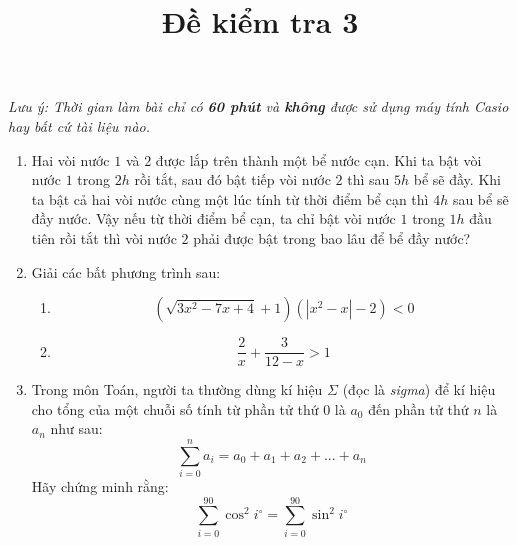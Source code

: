 \documentclass{article}
\title{Đề kiểm tra 3}
\begin{document}
\maketitle
\textit{Lưu ý: Thời gian làm bài chỉ có \textbf{60 phút} và \textbf{không} được sử dụng máy tính Casio hay bất cứ tài liệu nào.}
\begin{enumerate}[start=1,label={\bfseries Câu  \arabic*:},leftmargin=1in]
    \item Hai vòi nước $1$ và $2$ được lắp trên thành một bể nước cạn. Khi ta bật vòi nước $1$ trong $2h$ rồi tắt, sau đó bật tiếp vòi nước $2$ thì sau $5h$ bể sẽ đầy. Khi ta bật
cả hai vòi nước cùng một lúc tính từ thời điểm bể cạn thì $4h$ sau bể sẽ đầy nước. Vậy nếu từ thời điểm bể cạn, ta chỉ bật vòi nước $1$ trong $1h$ đầu tiên rồi tắt thì vòi nước $2$ phải được bật trong bao lâu để bể đầy nước?
    \item Giải các bất phương trình sau:
    \begin{enumerate}
        \item $$(\sqrt{3x^2-7x+4}+1)(|x^2-x|-2)<0$$
        \item $$\frac{2}{x}+\frac{3}{12-x}>1$$
    \end{enumerate}
    \item Trong môn Toán, người ta thường dùng kí hiệu $\Sigma$ (đọc là \textit{sigma}) để kí hiệu cho tổng của một chuỗi số tính từ phần tử thứ $0$ là $a_{0}$ đến phần tử
    thứ $n$ là $a_{n}$ như sau:
    $$\sum_{i=0}^{n}a_{i}=a_{0}+a_{1}+a_{2}+...+a_{n}$$
    Hãy chứng minh rằng:
    $$\sum_{i=0}^{90}\cos^2{i^\circ}=\sum_{i=0}^{90}\sin^2{i^\circ}$$
\end{enumerate}
\end{document}
